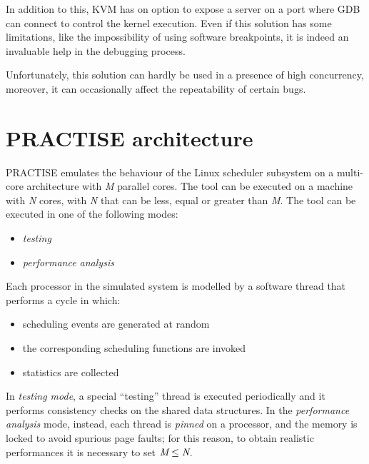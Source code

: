 In addition to this, KVM has on option to expose a server on a port where GDB can connect to
control the kernel execution. Even if this solution has some limitations, like the impossibility
of using software breakpoints, it is indeed an invaluable help in the debugging process.

Unfortunately, this solution can hardly be used in a presence of high concurrency, moreover,
it can occasionally affect the repeatability of certain bugs.

\section{PRACTISE architecture\label{PRACTISE_arch}}
PRACTISE emulates the behaviour of the Linux scheduler subsystem on a multi-core architecture
with \emph{M} parallel cores. The tool can be executed on a machine with \emph{N} cores, with
\emph{N} that can be less, equal or greater than \emph{M}. The tool can be executed in one of
the following modes:

\begin{itemize}
\item \emph{testing}
\item \emph{performance analysis}
\end{itemize}

Each processor in the simulated system is modelled by a software thread that performs a cycle
in which:

\begin{itemize}
\item scheduling events are generated at random
\item the corresponding scheduling functions are invoked
\item statistics are collected
\end{itemize}

In \emph{testing mode}, a special ``testing'' thread is executed periodically and it performs
consistency checks on the shared data structures. In the \emph{performance analysis} mode, instead,
each thread is \emph{pinned} on a processor, and the memory is locked to avoid spurious page
faults; for this reason, to obtain realistic performances it is necessary to set 
\( \emph{M} \leq \emph{N} \).

